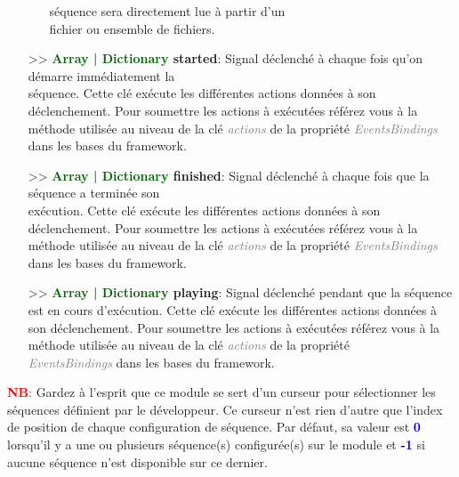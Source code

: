 \documentclass[a4paper, 11pt]{article}
\begin{document}
\begin{itemize}
\begin{itemize}
			séquence sera directement lue à partir d'un \\fichier ou ensemble de fichiers.\\
		\end{itemize}
		\item[>> \textbf{\textcolor{darkgreen}{Array | Dictionary} started}:] Signal déclenché à chaque fois 
		qu'on démarre immédiatement la \\séquence. Cette clé exécute les différentes actions données à son 
		déclenchement. Pour soumettre les actions à exécutées référez vous à la méthode utilisée au niveau
		de la clé \textit{\textcolor{gray}{actions}} de la propriété \textit{\textcolor{gray}
		{EventsBindings}} dans les bases du framework.\\
		\item[>> \textbf{\textcolor{darkgreen}{Array | Dictionary} finished}:] Signal déclenché à chaque 
		fois que la séquence a terminée son \\exécution. Cette clé exécute les différentes actions données à 
		son déclenchement. Pour soumettre les actions à exécutées référez vous à la méthode utilisée au
		niveau de la clé \textit{\textcolor{gray}{actions}} de la propriété \textit{\textcolor{gray}
		{EventsBindings}} dans les bases du framework.\\
		\item[>> \textbf{\textcolor{darkgreen}{Array | Dictionary} playing}:] Signal déclenché pendant que
		la séquence est en cours d'exécution. Cette clé exécute les différentes actions données à son
		déclenchement. Pour soumettre les actions à exécutées référez vous à la méthode utilisée au niveau
		de la clé \textit{\textcolor{gray}{actions}} de la propriété \textit{\textcolor{gray}
		{\\EventsBindings}} dans les bases du framework.\\
	\end{itemize}
	\textcolor{red}{\textbf{NB}:} Gardez à l'esprit que ce module se sert d'un curseur pour sélectionner les
	séquences définient par le développeur. Ce curseur n'est rien d'autre que l'index de position de chaque 
	configuration de séquence. Par défaut, sa valeur est \textbf{\textcolor{blue}{0}} lorsqu'il y a une ou
	plusieurs séquence(s) configurée(s) sur le module et \textbf{\textcolor{blue}{-1}} si aucune séquence 
	n'est disponible sur ce dernier.

\end{document}
